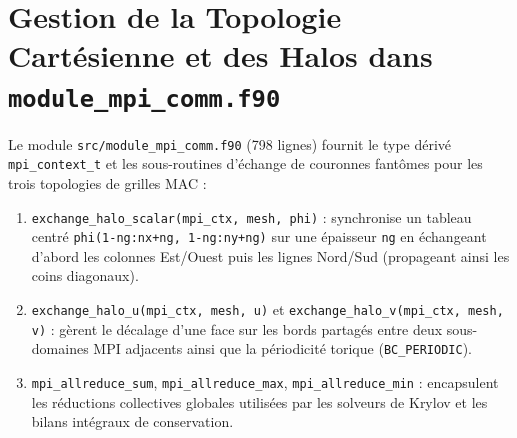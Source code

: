 \documentclass[10pt,a4paper,oneside]{book}
\begin{document}
\section{Gestion de la Topologie Cartésienne et des Halos dans \texttt{module\_mpi\_comm.f90}}
Le module \texttt{src/module\_mpi\_comm.f90} (798 lignes) fournit le type dérivé \texttt{mpi\_context\_t} et les sous-routines d'échange de couronnes fantômes pour les trois topologies de grilles MAC :
\begin{enumerate}
  \item \texttt{exchange\_halo\_scalar(mpi\_ctx, mesh, phi)} : synchronise un tableau centré \texttt{phi(1-ng:nx+ng, 1-ng:ny+ng)} sur une épaisseur \texttt{ng} en échangeant d'abord les colonnes Est/Ouest puis les lignes Nord/Sud (propageant ainsi les coins diagonaux).
  \item \texttt{exchange\_halo\_u(mpi\_ctx, mesh, u)} et \texttt{exchange\_halo\_v(mpi\_ctx, mesh, v)} : gèrent le décalage d'une face sur les bords partagés entre deux sous-domaines MPI adjacents ainsi que la périodicité torique (\texttt{BC\_PERIODIC}).
  \item \texttt{mpi\_allreduce\_sum}, \texttt{mpi\_allreduce\_max}, \texttt{mpi\_allreduce\_min} : encapsulent les réductions collectives globales utilisées par les solveurs de Krylov et les bilans intégraux de conservation.
\end{enumerate}
\end{document}

